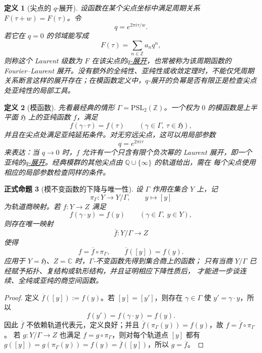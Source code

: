 \documentclass[UTF8,fontset=none,a4paper,11pt]{ctexart}
\theoremstyle{foundation-definition}
\newtheorem{definition}{定义}[section]
\theoremstyle{foundation-theorem}
\theoremstyle{foundation-proposition}
\newtheorem{proposition}[definition]{正式命题}
\theoremstyle{foundation-example}
\theoremstyle{foundation-remark}
\theoremstyle{foundation-theorem}
\newcommand{\term}[2]{\hyperref[#1]{#2}}
\begin{document}
\begin{definition}[尖点的 \(q\)-展开]\label{def:q-expansion}
设函数在某个尖点坐标中满足周期关系 \(F(\tau+w)=F(\tau)\)。令
\[
q=e^{2\pi i\tau/w}.
\]
若它在 \(q=0\) 的邻域能写成
\[
F(\tau)=\sum_{n\in\mathbb Z}a_nq^n,
\]
则称这个 Laurent 级数为 \(F\) 在该尖点的\term{def:q-expansion}{\(q\)-展开}，也常被称为该周期函数的 Fourier--Laurent 展开。没有额外的全纯性、亚纯性或收敛定理时，不能仅凭周期关系断言这样的展开存在；在模函数定义中，\(q\)-展开的负幂是否有限正是检查尖点处亚纯性的局部工具。
\end{definition}

\begin{definition}[模函数]\label{def:modular-function}
先看最经典的情形 \(\Gamma=\mathrm{PSL}_2(\mathbb Z)\)。一个权为 \(0\) 的模函数是上半平面 \(\mathfrak H\) 上的亚纯函数 \(f\)，满足
\[
f(\gamma\cdot\tau)=f(\tau)\qquad(\gamma\in\Gamma,\ \tau\in\mathfrak H),
\]
并且在尖点处满足亚纯延拓条件。对无穷远尖点，这可以用局部参数
\[
q=e^{2\pi i\tau}
\]
来表达：当 \(q\to0\) 时，\(f\) 允许有一个只含有限个负次幂的 Laurent
展开，即一个亚纯的\term{def:q-expansion}{\(q\)-展开}。经典模群的其他尖点由 \(\mathbb Q\cup\{\infty\}\) 的轨道给出，需在
每个尖点使用相应的局部参数检查同样的条件。
\end{definition}

\begin{proposition}[模不变函数的下降与唯一性]\label{prop:modular-invariant-descent}
设 \(\Gamma\) 作用在集合 \(Y\) 上，记
\[
\pi_\Gamma:Y\longrightarrow Y/\Gamma,\qquad
y\longmapsto [y]
\]
为轨道商映射。若 \(f:Y\to Z\) 满足
\[
f(\gamma\cdot y)=f(y)\qquad(\gamma\in\Gamma,\ y\in Y),
\]
则存在唯一映射
\[
\overline f:Y/\Gamma\longrightarrow Z
\]
使得
\[
f=\overline f\circ\pi_\Gamma,\qquad
\overline f([y])=f(y).
\]
应用于 \(Y=\mathfrak H\)、\(Z=\mathbb C\) 时，\(\Gamma\)-不变函数先得到集合商上的函数；
只有当商 \(Y/\Gamma\) 已经赋予拓扑、复结构或轨形结构，并且证明相应下降性质后，
才能进一步谈连续、全纯或亚纯的商空间函数。
\end{proposition}

\begin{proof}
定义 \(\overline f([y]):=f(y)\)。若 \([y]=[y']\)，则存在 \(\gamma\in\Gamma\) 使
\(y'=\gamma\cdot y\)，所以
\[
f(y')=f(\gamma\cdot y)=f(y).
\]
因此 \(\overline f\) 不依赖轨道代表元，定义良好；并且
\(\overline f(\pi_\Gamma(y))=f(y)\)，故 \(f=\overline f\circ\pi_\Gamma\)。
若 \(g:Y/\Gamma\to Z\) 也满足 \(f=g\circ\pi_\Gamma\)，则对每个轨道点
\([y]\) 都有 \(g([y])=g(\pi_\Gamma(y))=f(y)=\overline f([y])\)，所以 \(g=\overline f\)。
\end{proof}
\end{document}
